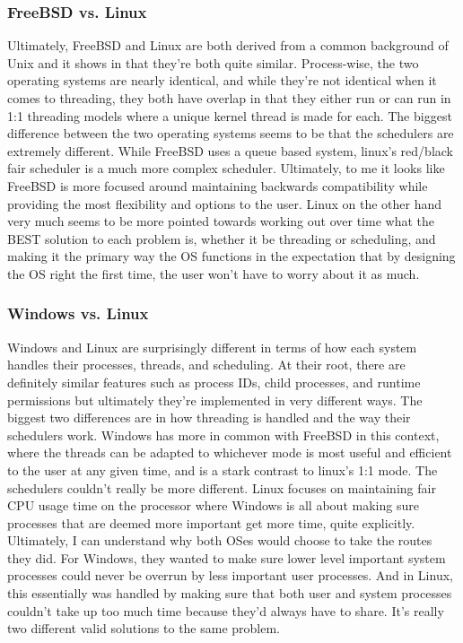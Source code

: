 \subsubsection{FreeBSD vs. Linux}
Ultimately, FreeBSD and Linux are both derived from a common background of Unix and it shows in that they're both quite similar. Process-wise, the two operating systems are nearly identical, and while they're not identical when it comes to threading, they both have overlap in that they either run or can run in 1:1 threading models where a unique kernel thread is made for each. The biggest difference between the two operating systems seems to be that the schedulers are extremely different. While FreeBSD uses a queue based system, linux's red/black fair scheduler is a much more complex scheduler. Ultimately, to me it looks like FreeBSD is more focused around maintaining backwards compatibility while providing the most flexibility and options to the user. Linux on the other hand very much seems to be more pointed towards working out over time what the BEST solution to each problem is, whether it be threading or scheduling, and making it the primary way the OS functions in the expectation that by designing the OS right the first time, the user won't have to worry about it as much. 

\subsubsection{Windows vs. Linux}
Windows and Linux are surprisingly different in terms of how each system handles their processes, threads, and scheduling. At their root, there are definitely similar features such as process IDs, child processes, and runtime permissions but ultimately they're implemented in very different ways. The biggest two differences are in how threading is handled and the way their schedulers work. Windows has more in common with FreeBSD in this context, where the threads can be adapted to whichever mode is most useful and efficient to the user at any given time, and is a stark contrast to linux's 1:1 mode. The schedulers couldn't really be more different. Linux focuses on maintaining fair CPU usage time on the processor where Windows is all about making sure processes that are deemed more important get more time, quite explicitly. Ultimately, I can understand why both OSes would choose to take the routes they did. For Windows, they wanted to make sure lower level important system processes could never be overrun by less important user processes. And in Linux, this essentially was handled by making sure that both user and system processes couldn't take up too much time because they'd always have to share. It's really two different valid solutions to the same problem.